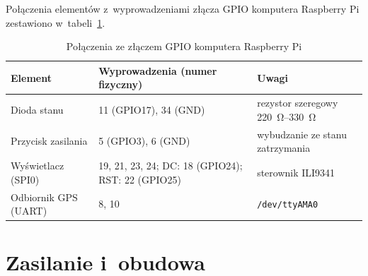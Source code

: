 Połączenia elementów z~wyprowadzeniami złącza GPIO komputera Raspberry Pi
zestawiono w~tabeli~\ref{tab:gpio}.

\begin{table}[H]
  \centering
  \caption{Połączenia ze złączem GPIO komputera Raspberry Pi}
  \label{tab:gpio}
  \small
  \begin{tabular}{>{\raggedright}p{3.6cm} >{\raggedright}p{5.2cm} >{\raggedright\arraybackslash}p{4.8cm}}
    \toprule
    Element & Wyprowadzenia (numer fizyczny) & Uwagi \\
    \midrule
    Dioda stanu          & 11 (GPIO17), 34 (GND) & rezystor szeregowy \SIrange{220}{330}{\ohm} \\
    Przycisk zasilania   & 5 (GPIO3), 6 (GND)    & wybudzanie ze stanu zatrzymania \\
    Wyświetlacz (SPI0)   & 19, 21, 23, 24; DC: 18 (GPIO24); RST: 22 (GPIO25) & sterownik ILI9341 \\
    Odbiornik GPS (UART) & 8, 10                 & \texttt{/dev/ttyAMA0} \\
    \bottomrule
  \end{tabular}
\end{table}

\section{Zasilanie i~obudowa}
\label{sec:zasilanie}
